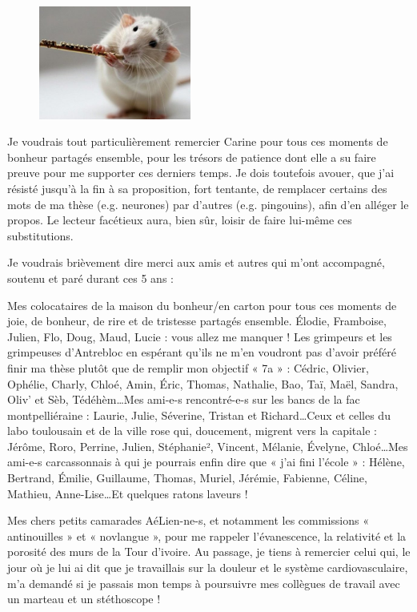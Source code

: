 \documentclass[a4paper,12pt,twoside]{report}
\begin{document}
\begin{onehalfspacing}
\begin{figure}
\includegraphics[width=5cm]{Souris.jpg}
\end{figure}
Je voudrais tout particulièrement remercier Carine pour tous ces moments de bonheur partagés ensemble, pour les trésors de patience dont elle a su faire preuve pour me supporter ces derniers temps. Je dois toutefois avouer, que j’ai résisté jusqu’à la fin à sa proposition, fort tentante, de remplacer certains des mots de ma thèse (e.g. neurones) par d’autres (e.g. pingouins), afin d’en alléger le propos. Le lecteur facétieux aura, bien sûr, loisir de faire lui-même ces substitutions.

\vspace{0.5cm}
Je voudrais brièvement dire merci aux amis et autres qui m’ont accompagné, soutenu et paré durant ces 5 ans :

Mes colocataires de la maison du bonheur/en carton pour tous ces moments de joie, de bonheur, de rire et de tristesse partagés ensemble. \' Elodie, Framboise, Julien, Flo, Doug, Maud, Lucie : vous allez me manquer ! Les grimpeurs et les grimpeuses d’Antrebloc en espérant qu’ils ne m’en voudront pas d’avoir préféré finir ma thèse plutôt que de remplir mon objectif « 7a » : Cédric, Olivier, Ophélie, Charly, Chloé, Amin, \' Eric, Thomas, Nathalie, Bao, Taï, Maël, Sandra, Oliv’ et Sèb, Tédéhèm\ldots Mes ami-e-s rencontré-e-s sur les bancs de la fac montpelliéraine : Laurie, Julie, Séverine, Tristan et Richard\ldots Ceux et celles du labo toulousain et de la ville rose qui, doucement, migrent vers la capitale : Jérôme, Roro, Perrine, Julien, Stéphanie², Vincent, Mélanie, \' Evelyne, Chloé\ldots Mes ami-e-s carcassonnais à qui je pourrais enfin dire que « j’ai fini l’école » : Hélène, Bertrand, \' Emilie, Guillaume, Thomas, Muriel, Jérémie, Fabienne, Céline, Mathieu, Anne-Lise\ldots Et quelques ratons laveurs !

Mes chers petits camarades AéLien-ne-s, et notamment les commissions « antinouilles » et « novlangue », pour me rappeler l’évanescence, la relativité et la porosité des murs de la Tour d’ivoire. Au passage, je tiens à remercier celui qui, le jour où je lui ai dit que je travaillais sur la douleur et le système cardiovasculaire, m’a demandé si je passais mon temps à poursuivre mes collègues de travail avec un marteau et un stéthoscope !


\end{onehalfspacing}
\end{document}
